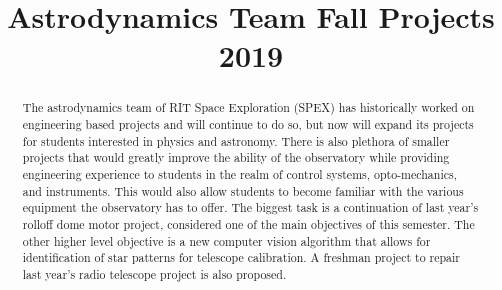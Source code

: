 \documentclass[conference]{IEEEtran} %
\title{Astrodynamics Team Fall Projects 2019 }
\author{
  \IEEEauthorblockN{%
    Amber Dubill\IEEEauthorrefmark{1},  %
    Evan Putnam\IEEEauthorrefmark{2},
    Dr. Jennifer Connelly\IEEEauthorrefmark{3}, and 
   Dr. Micheal Richmond\IEEEauthorrefmark{4},
  }
  \IEEEauthorblockA{%
    RIT Space Exploration, Rochester Institute of Technology \\ %
    Rochester, N.Y. \\
    Email:
    \IEEEauthorrefmark{1}ald4035@rit.edu,
    \IEEEauthorrefmark{2}ald4035@rit.edu,
    \IEEEauthorrefmark{3}jlcsps@rit.edu,
    \IEEEauthorrefmark{4}mwrsps@rit.edu,
  }

}
\begin{document}
\maketitle%

\begin{abstract}
   The astrodynamics team of RIT Space Exploration (SPEX) has historically worked on engineering based projects and will continue to do so, but now will expand its projects for students interested in physics and astronomy. There is also plethora of smaller projects that would greatly improve the ability of the observatory while providing engineering experience to students in the realm of control systems, opto-mechanics, and instruments. This would also allow students to become familiar with the various equipment the observatory has to offer. The biggest task is a continuation of last year's rolloff dome motor project, considered one of the main objectives of this semester. The other higher level objective is a new computer vision algorithm that allows for identification of star patterns for telescope calibration. A freshman project to repair last year's radio telescope project is also proposed.
   
   
\end{abstract}
\end{document}
